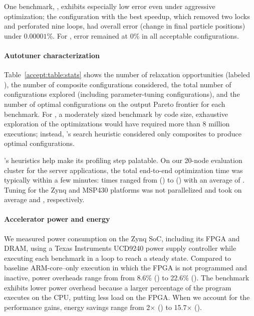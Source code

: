 One benchmark, , exhibits especially low error even under
aggressive optimization;
the configuration with the best speedup,
which removed two locks and perforated nine loops, had
overall error (change in final particle positions) under $0.00001$\%.  For
, error remained at $0$\% in all acceptable
configurations.

\paragraph{Autotuner characterization}

Table~\ref{accept:table:stats} shows
the number of relaxation opportunities (labeled ), the number of
composite configurations considered, the total number of configurations
explored (including parameter-tuning configurations),
and the number of optimal configurations on the output Pareto frontier
for each benchmark.
For , a moderately sized benchmark by code size,
exhaustive exploration of the 
optimizations would
have required more than 8 million executions;
instead, \sysname's search heuristic considered only
 composites
to produce  optimal configurations.

\sysname's heuristics help make its profiling step palatable.
On our 20-node evaluation cluster for the server applications, the total end-to-end optimization time was
typically within a few minutes: times ranged from 
() to 
() with an
average of .
Tuning for the Zynq and MSP430 platforms was not parallelized and took
 on average and
, respectively.

\paragraph{Accelerator power and energy}
We measured power consumption on the Zynq SoC, including its FPGA and DRAM,
using a Texas Instruments UCD9240 power supply controller while executing each
benchmark in a loop to reach a steady state.
Compared to baseline ARM-core--only execution in which the FPGA is
not programmed and inactive, power overheads range from
from 8.6\% ()
to 22.6\% ().
The  benchmark exhibits
lower power overhead because a larger percentage
of the program executes on the CPU, putting less load on the FPGA.
When we account for the performance gains, energy savings range from 2$\times$ () to 15.7$\times$ ().

